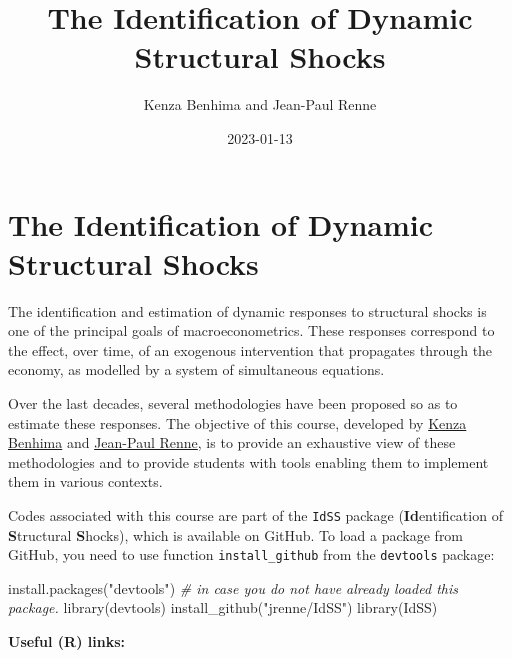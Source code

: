 \documentclass[
  12pt,
]{book}
\title{The Identification of Dynamic Structural Shocks}
\author{Kenza Benhima and Jean-Paul Renne}
\date{2023-01-13}
\newenvironment{Shaded}{\begin{snugshade}}{\end{snugshade}}
\newcommand{\CommentTok}[1]{\textcolor[rgb]{0.56,0.35,0.01}{\textit{#1}}}
\newcommand{\FunctionTok}[1]{\textcolor[rgb]{0.00,0.00,0.00}{#1}}
\newcommand{\NormalTok}[1]{#1}
\newcommand{\StringTok}[1]{\textcolor[rgb]{0.31,0.60,0.02}{#1}}
\theoremstyle{definition}
\theoremstyle{definition}
\theoremstyle{definition}
\theoremstyle{definition}
\theoremstyle{remark}
\begin{document}
\maketitle

{
\setcounter{tocdepth}{1}
\tableofcontents
}
\newcommand{\bv}[1]{\mathbf{#1}}

\hypertarget{intro}{%
\chapter*{The Identification of Dynamic Structural Shocks}\label{intro}}

The identification and estimation of dynamic responses to structural shocks is one of the principal goals of macroeconometrics. These responses correspond to the effect, over time, of an exogenous intervention that propagates through the economy, as modelled by a system of simultaneous equations.

Over the last decades, several methodologies have been proposed so as to estimate these responses. The objective of this course, developed by \href{https://sites.google.com/site/benhimakenza/}{Kenza Benhima} and \href{https://sites.google.com/site/jeanpaulrenne/home}{Jean-Paul Renne}, is to provide an exhaustive view of these methodologies and to provide students with tools enabling them to implement them in various contexts.

Codes associated with this course are part of the \texttt{IdSS} package (\textbf{Id}entification of \textbf{S}tructural \textbf{S}hocks), which is available on GitHub. To load a package from GitHub, you need to use function \texttt{install\_github} from the \texttt{devtools} package:

\begin{Shaded}
\begin{Highlighting}[]
\FunctionTok{install.packages}\NormalTok{(}\StringTok{"devtools"}\NormalTok{) }\CommentTok{\# in case you do not have already loaded this package.}
\FunctionTok{library}\NormalTok{(devtools)}
\FunctionTok{install\_github}\NormalTok{(}\StringTok{"jrenne/IdSS"}\NormalTok{)}
\FunctionTok{library}\NormalTok{(IdSS)}
\end{Highlighting}
\end{Shaded}

\textbf{Useful (R) links:}
\end{document}
